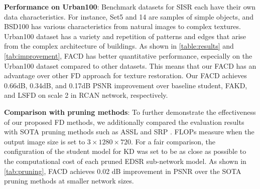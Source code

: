 \documentclass[10pt,twocolumn,letterpaper]{article}
\begin{document}
\noindent \textbf{Performance on Urban100}: Benchmark datasets for SISR each have their own data characteristics. For instance, Set5 and 14 are samples of simple objects, and BSD100 has various characteristics from natural images to complex textures. Urban100 dataset has a variety and repetition of patterns and edges that arise from the complex architecture of buildings. As shown in \cref{table:results} and \cref{tab:improvement}, FACD has better quantitative performance, especially on the Urban100 dataset compared to other datasets. This means that our FACD has an advantage over other FD approach for texture restoration. Our FACD achieves 0.66dB, 0.34dB, and 0.17dB PSNR improvement over baseline student, FAKD, and LSFD on scale 2 in RCAN network, respectively. 


\begin{table}[]
\caption{Evaluation results on average PSNR improvement over other FD approaches. Performance improvement over 0.1dB is marked in \underline{underlined}. }
\label{tab:improvement}
\end{table}

\noindent \textbf{Comparison with pruning methods}: To further demonstrate the effectiveness of our proposed FD methods, we additionally compared the evaluation results with SOTA pruning methods such as ASSL \cite{assl} and SRP \cite{srp}. FLOPs measure when the output image size is set to \begin{math}3\times1280\times720\end{math}. For a fair comparison, the configuration of the student model for KD was set to be as close as possible to the computational cost of each pruned EDSR sub-network model. As shown in \cref{tab:pruning}, FACD achieves 0.02 dB improvement in PSNR over the SOTA pruning methods at smaller network sizes.
\end{document}

